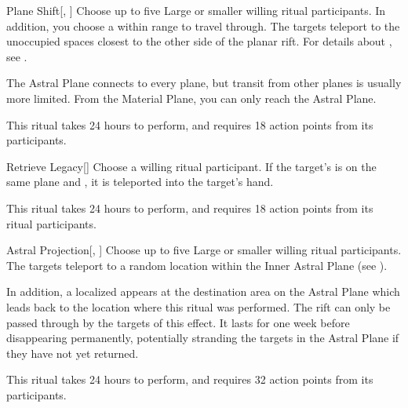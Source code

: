 \begin{ability}[\nth{3}]{Plane Shift}[, ]
Choose up to five Large or smaller willing ritual participants.
In addition, you choose a  within \rngmed range to travel through.
The targets teleport to the unoccupied spaces closest to the other side of the planar rift.
For details about , see .

The Astral Plane connects to every plane, but transit from other planes is usually more limited.
From the Material Plane, you can only reach the Astral Plane.

This ritual takes 24 hours to perform, and requires 18 action points from its participants.
\end{ability}
\vspace{0.25em}



\begin{ability}[\nth{3}]{Retrieve Legacy}[]
Choose a willing ritual participant.
If the target's  is on the same plane and , it is teleported into the target's hand.

This ritual takes 24 hours to perform, and requires 18 action points from its ritual participants.
\end{ability}
\vspace{0.25em}



\begin{ability}[\nth{4}]{Astral Projection}[, ]
Choose up to five Large or smaller willing ritual participants.
The targets teleport to a random location within the Inner Astral Plane (see ).

In addition, a localized  appears at the destination area on the Astral Plane which leads back to the location where this ritual was performed.
The rift can only be passed through by the targets of this effect.
It lasts for one week before disappearing permanently, potentially stranding the targets in the Astral Plane if they have not yet returned.

This ritual takes 24 hours to perform, and requires 32 action points from its participants.
\end{ability}
\vspace{0.25em}




